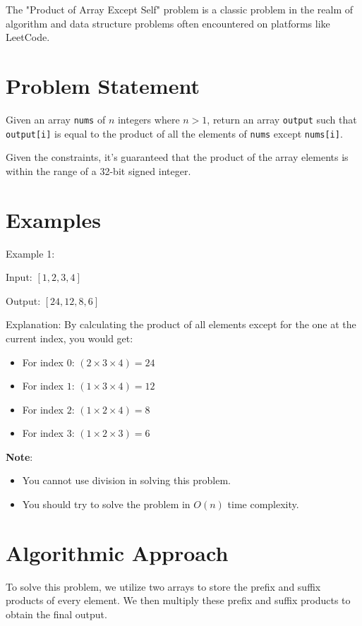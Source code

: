 

\label{problem:Product_of_Array_Except_Self}

The "Product of Array Except Self" problem is a classic problem in the realm of algorithm and data structure problems often encountered on platforms like LeetCode.

\section*{Problem Statement}
Given an array \texttt{nums} of \(n\) integers where \(n > 1\), return an array \texttt{output} such that \texttt{output[i]} is equal to the product of all the elements of \texttt{nums} except \texttt{nums[i]}.

Given the constraints, it's guaranteed that the product of the array elements is within the range of a 32-bit signed integer.


\section*{Examples}
Example 1:

Input: \( [1,2,3,4] \)

Output: \( [24,12,8,6] \)

Explanation: By calculating the product of all elements except for the one at the current index, you would get:
\begin{itemize}
	\item For index \( 0 \): \( (2 \times 3 \times 4) = 24 \)
	\item For index \( 1 \): \( (1 \times 3 \times 4) = 12 \)
	\item For index \( 2 \): \( (1 \times 2 \times 4) = 8 \)
	\item For index \( 3 \): \( (1 \times 2 \times 3) = 6 \)
\end{itemize}

\textbf{Note}:
\begin{itemize}
	\item You cannot use division in solving this problem.
	\item You should try to solve the problem in \(O(n)\) time complexity.
\end{itemize}

\section*{Algorithmic Approach}
To solve this problem, we utilize two arrays to store the prefix and suffix products of every element. We then multiply these prefix and suffix products to obtain the final output.

